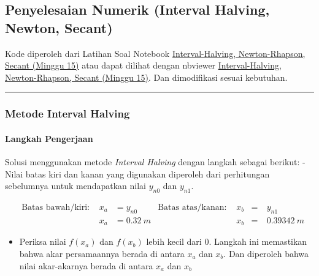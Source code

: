 \documentclass[10pt, a4paper]{article}
\providecommand{\tightlist}{%
      \setlength{\itemsep}{0pt}\setlength{\parskip}{0pt}}
\begin{document}
\newpage
\subsection{Penyelesaian Numerik (Interval Halving, Newton,
Secant)}\label{penyelesaian-numerik-interval-halving-newton-secant}

Kode diperoleh dari Latihan Soal Notebook
\href{https://github.com/taruma/belajar-tsa/blob/master/ansis/Interval-Halving\%2C\%20Newton-Rhapson\%2C\%20Secant\%20(Minggu\%2015).ipynb}{Interval-Halving,
Newton-Rhapson, Secant (Minggu 15)} atau dapat dilihat dengan nbviewer
\href{https://nbviewer.jupyter.org/github/taruma/belajar-tsa/blob/master/ansis/Interval-Halving\%2C\%20Newton-Rhapson\%2C\%20Secant\%20\%28Minggu\%2015\%29.ipynb}{Interval-Halving,
Newton-Rhapson, Secant (Minggu 15)}. Dan dimodifikasi sesuai kebutuhan.

\begin{center}\rule{0.5\linewidth}{\linethickness}\end{center}

\subsubsection{Metode Interval Halving}\label{metode-interval-halving}

\paragraph{Langkah Pengerjaan}\label{langkah-pengerjaan}

Solusi menggunakan metode \emph{Interval Halving} dengan langkah sebagai
berikut: - Nilai batas kiri dan kanan yang digunakan diperoleh dari
perhitungan sebelumnya untuk mendapatkan nilai \(y_{n0}\) dan
\(y_{n1}\).

\[\begin{aligned} &\text{Batas bawah/kiri: }& x_a &= y_{n0} &\text{Batas atas/kanan: }& x_b &=&\ y_{n1} \\
&& x_a &= 0.32\ m && x_b &=&\ 0.39342\ m \end{aligned}\]

\begin{itemize}
\tightlist
\item
  Periksa nilai \(f(x_a)\) dan \(f(x_b)\) lebih kecil dari \(0\).
  Langkah ini memastikan bahwa akar persamaannya berada di antara
  \(x_a\) dan \(x_b\). Dan diperoleh bahwa nilai akar-akarnya berada di
  antara \(x_a\) dan \(x_b\)
\end{itemize}
\end{document}
